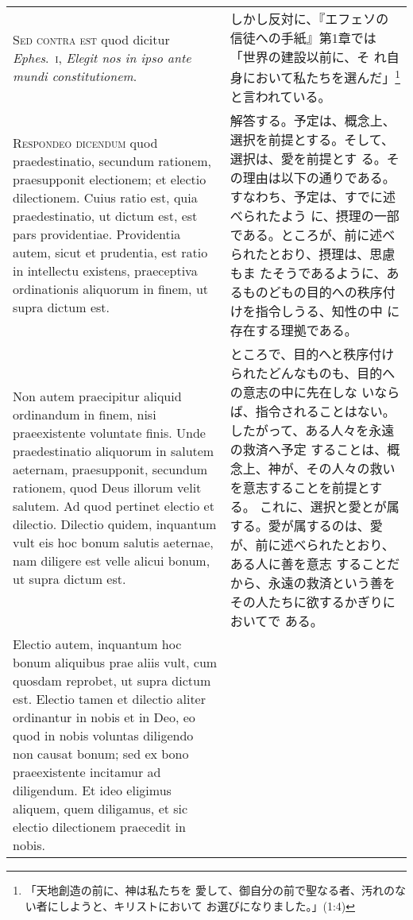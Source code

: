 \documentclass[10pt]{jsarticle} %
\begin{document}
\begin{longtable}{p{21em}p{21em}}
{\scshape Sed contra est} quod dicitur {\itshape Ephes}.~{\scshape i}, {\itshape Elegit
 nos in ipso ante mundi constitutionem}.


&

しかし反対に、『エフェソの信徒への手紙』第1章では「世界の建設以前に、そ
 れ自身において私たちを選んだ」\footnote{「天地創造の前に、神は私たちを
 愛して、御自分の前で聖なる者、汚れのない者にしようと、キリストにおいて
 お選びになりました。」(1:4)}と言われている。

\\



{\scshape Respondeo dicendum} quod praedestinatio,
 secundum rationem, praesupponit electionem; et electio
 dilectionem. Cuius ratio est, quia praedestinatio, ut dictum est, est
 pars providentiae. Providentia autem, sicut et prudentia, est ratio in
 intellectu existens, praeceptiva ordinationis aliquorum in finem, ut
 supra dictum est. 


&

解答する。予定は、概念上、選択を前提とする。そして、選択は、愛を前提とす
 る。その理由は以下の通りである。すなわち、予定は、すでに述べられたよう
 に、摂理の一部である。ところが、前に述べられたとおり、摂理は、思慮もま
 たそうであるように、あるものどもの目的への秩序付けを指令しうる、知性の中
 に存在する理拠である。


\\


Non autem praecipitur aliquid ordinandum in finem,
 nisi praeexistente voluntate finis. Unde praedestinatio aliquorum in
 salutem aeternam, praesupponit, secundum rationem, quod Deus illorum
 velit salutem. Ad quod pertinet electio et dilectio. Dilectio quidem,
 inquantum vult eis hoc bonum salutis aeternae, nam diligere est velle
 alicui bonum, ut supra dictum est. 



&


ところで、目的へと秩序付けられたどんなものも、目的への意志の中に先在しな
 いならば、指令されることはない。したがって、ある人々を永遠の救済へ予定
 することは、概念上、神が、その人々の救いを意志することを前提とする。
これに、選択と愛とが属する。愛が属するのは、愛が、前に述べられたとおり、ある人に善を意志
 することだから、永遠の救済という善をその人たちに欲するかぎりにおいてで
 ある。

\\


Electio autem, inquantum hoc bonum
 aliquibus prae aliis vult, cum quosdam reprobet, ut supra dictum
 est. Electio tamen et dilectio aliter ordinantur in nobis et in Deo, eo
 quod in nobis voluntas diligendo non causat bonum; sed ex bono
 praeexistente incitamur ad diligendum. Et ideo eligimus aliquem, quem
 diligamus, et sic electio dilectionem praecedit in nobis. 



\end{longtable}
\end{document}
